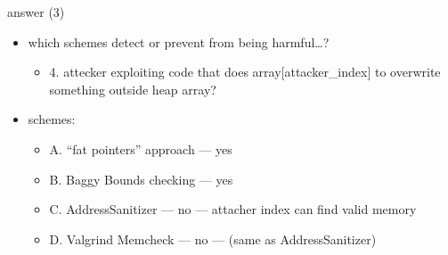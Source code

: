 \begin{frame}{answer (3)}
\begin{itemize}
\item which schemes detect or prevent from being harmful\ldots?
    \begin{itemize}
    \item 4. attecker exploiting code that does array[attacker\_index] to overwrite something outside heap array?
    \end{itemize}
\item schemes:
    \begin{itemize}
    \item A. ``fat pointers'' approach --- yes
    \item B. Baggy Bounds checking --- yes
    \item C. AddressSanitizer --- no --- attacher index can find valid memory
    \item D. Valgrind Memcheck --- no --- (same as AddressSanitizer)
    \end{itemize}
\end{itemize}
\end{frame}
